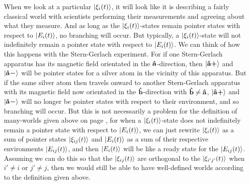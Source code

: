     When we look at a particular $\ket{\xi_i(t)}$, it will look like it is describing a fairly classical world with scientists performing their measurements and agreeing about what they measure. And as long as the $\ket{\xi_i(t)}$-states remain pointer states with respect to $\ket{E_i(t)}$, no branching will occur. But typically, a $\ket{\xi_i(t)}$-state will not indefinitely remain a pointer state with respect to $\ket{E_i(t)}$. We can think of how this happens with the Stern-Gerlach experiment. For if one Stern-Gerlach apparatus has its magnetic field orientated in the $\vb{\hat{{a}}}$-direction, then $\ket{\vb{\hat{{a}}}\bm{+}}$ and $\ket{\vb{\hat{{a}}}\bm{-}}$ will be pointer states for a silver atom in the vicinity of this apparatus. But if the same silver atom then travels onward to another Stern-Gerlach apparatus with its magnetic field now orientated in the $\vb{\hat{{b}}}$-direction with $\vb{\hat{{b}}}\neq\vb{\hat{{a}}}$, $\ket{\vb{\hat{{a}}}\bm{+}}$ and $\ket{\vb{\hat{{a}}}\bm{-}}$ will no longer be pointer states with respect to their environment, and so branching will occur. But this is not necessarily a problem for the definition of many-worlds given above on page \pageref{rigorousworld}, for when a $\ket{\xi_i(t)}$-state does not indefinitely remain a pointer state with respect to $\ket{E_i(t)}$, we can just rewrite $\ket{\xi_i(t)}$ as a sum of pointer states $\ket{\xi_{ij}(t)}$ and $\ket{E_i(t)}$  as a sum of their respective environments $\ket{E_{ij}(t)}$, and then $\ket{E_i(t)}$ will be like a ready state for the $\ket{E_{ij}(t)}$. Assuming we can do this so that the $\ket{\xi_{ij}(t)}$ are orthogonal to the $\ket{\xi_{i'j'}(t)}$ when $i'\neq i$ or $j'\neq j$, then we would still be able to have well-defined worlds according to the definition given above.

